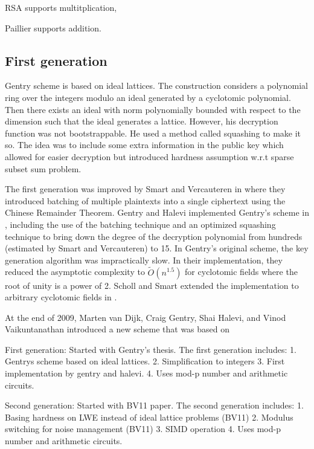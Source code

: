 RSA supports multitplication,

Paillier supports addition.


\subsection{First generation}
Gentry scheme is based on ideal lattices. The construction considers a polynomial ring over the integers modulo an ideal generated by a cyclotomic polynomial. Then there exists an ideal with norm polynomially bounded with respect to the dimension such that the ideal generates a lattice. 
However, his decryption function was not bootstrappable. He used a method called squashing to make it so. The idea was to include some extra information in the public key which allowed for easier decryption but introduced hardness assumption w.r.t sparse subset sum problem.

The first generation was improved by Smart and Vercauteren in \cite{SV09-batch} where they introduced batching of multiple plaintexts into a single ciphertext using the Chinese Remainder Theorem. Gentry and Halevi implemented Gentry's scheme in \cite{GS10-impl}, including the use of the batching technique and an optimized squashing technique to bring down the degree of the decryption polynomial from hundreds (estimated by Smart and Vercauteren) to 15. In Gentry's original scheme, the key generation algorithm was impractically slow. In their implementation, they reduced the asymptotic complexity to $\tilde{O}\left(n^{1.5}\right)$ for cyclotomic fields where the root of unity is a power of 2. Scholl and Smart extended the implementation to arbitrary cyclotomic fields in \cite{SS11-keygen}.

At the end of 2009, Marten van Dijk, Craig Gentry, Shai Halevi, and Vinod Vaikuntanathan introduced a new scheme that was based on 

First generation:
Started with Gentry's thesis. The first generation includes:
1. Gentrys scheme based on ideal lattices.
2. Simplification to integers
3. First implementation by gentry and halevi.
4. Uses mod-p number and arithmetic circuits.

Second generation:
Started with BV11 paper. The second generation includes:
1. Basing hardness on LWE instead of ideal lattice problems (BV11)
2. Modulus switching for noise management (BV11)
3. SIMD operation
4. Uses mod-p number and arithmetic circuits.

